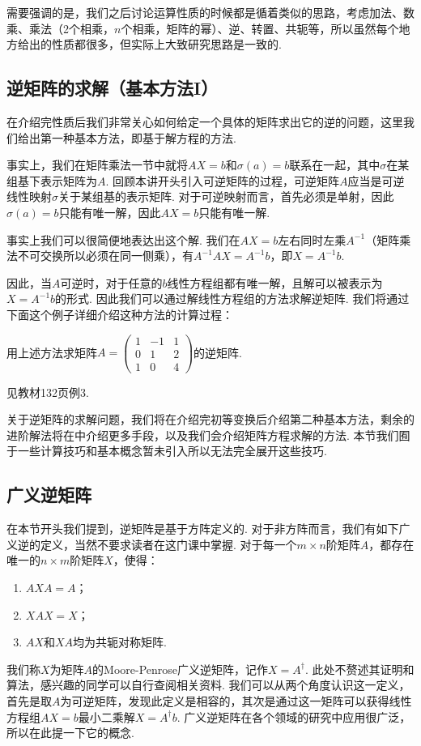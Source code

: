 需要强调的是，我们之后讨论运算性质的时候都是循着类似的思路，考虑加法、数乘、乘法（2个相乘，$n$个相乘，矩阵的幂）、逆、转置、共轭等，所以虽然每个地方给出的性质都很多，但实际上大致研究思路是一致的.

\subsection{逆矩阵的求解（基本方法I）}

在介绍完性质后我们非常关心如何给定一个具体的矩阵求出它的逆的问题，这里我们给出第一种基本方法，即基于解方程的方法.

事实上，我们在矩阵乘法一节中就将$AX=b$和$\sigma(a)=b$联系在一起，其中$\sigma$在某组基下表示矩阵为$A$. 回顾本讲开头引入可逆矩阵的过程，可逆矩阵$A$应当是可逆线性映射$\sigma$关于某组基的表示矩阵. 对于可逆映射而言，首先必须是单射，因此$\sigma(a)=b$只能有唯一解，因此$AX=b$只能有唯一解.

事实上我们可以很简便地表达出这个解. 我们在$AX=b$左右同时左乘$A^{-1}$（矩阵乘法不可交换所以必须在同一侧乘），有$A^{-1}AX=A^{-1}b$，即$X=A^{-1}b$.

因此，当$A$可逆时，对于任意的$b$线性方程组都有唯一解，且解可以被表示为$X=A^{-1}b$的形式. 因此我们可以通过解线性方程组的方法求解逆矩阵. 我们将通过下面这个例子详细介绍这种方法的计算过程：
\begin{example}{}{}
    用上述方法求矩阵$A=\begin{pmatrix}1 & -1 & 1 \\ 0 & 1 & 2 \\ 1 & 0 & 4\end{pmatrix}$的逆矩阵.
\end{example}

\begin{solution}
    见教材132页例3.
\end{solution}

关于逆矩阵的求解问题，我们将在介绍完初等变换后介绍第二种基本方法，剩余的进阶解法将在中介绍更多手段，以及我们会介绍矩阵方程求解的方法. 本节我们囿于一些计算技巧和基本概念暂未引入所以无法完全展开这些技巧.

\subsection{广义逆矩阵}

在本节开头我们提到，逆矩阵是基于方阵定义的. 对于非方阵而言，我们有如下广义逆的定义，当然不要求读者在这门课中掌握. 对于每一个$m \times n$阶矩阵$A$，都存在唯一的$n \times m$阶矩阵$X$，使得：
\begin{enumerate}
    \item $AXA=A$；

    \item $XAX=X$；

    \item $AX$和$XA$均为共轭对称矩阵.
\end{enumerate}
我们称$X$为矩阵$A$的Moore-Penrose广义逆矩阵，记作$X=A^\dagger$. 此处不赘述其证明和算法，感兴趣的同学可以自行查阅相关资料. 我们可以从两个角度认识这一定义，首先是取$A$为可逆矩阵，发现此定义是相容的，其次是通过这一矩阵可以获得线性方程组$AX=b$最小二乘解$X=A^\dagger b$. 广义逆矩阵在各个领域的研究中应用很广泛，所以在此提一下它的概念.


